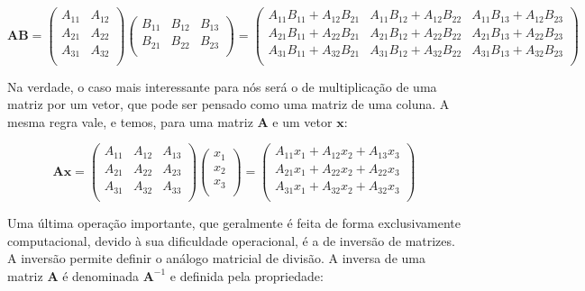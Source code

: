 \documentclass[portuges,]{tufte-handout}
\begin{document}
\[
\mathbf{A}\mathbf{B} =
\left (
\begin{matrix}
A_{11} & A_{12} \\
A_{21} & A_{22}  \\
A_{31} & A_{32} \\
\end{matrix}
\right )
\left (
\begin{matrix}
B_{11} & B_{12} & B_{13} \\
B_{21} & B_{22} & B_{23} \\
\end{matrix}
\right )
=
\left (
\begin{smallmatrix}
A_{11}B_{11} +  A_{12}B_{21} & A_{11}B_{12} +  A_{12}B_{22} & A_{11}B_{13} +  A_{12}B_{23} \\
A_{21}B_{11} +  A_{22}B_{21} & A_{21}B_{12} +  A_{22}B_{22} & A_{21}B_{13} +  A_{22}B_{23} \\
A_{31}B_{11} +  A_{32}B_{21} & A_{31}B_{12} +  A_{32}B_{22} & A_{31}B_{13} +  A_{32}B_{23} \\
\end{smallmatrix}
\right )
\]

Na verdade, o caso mais interessante para nós será o de multiplicação de
uma matriz por um vetor, que pode ser pensado como uma matriz de uma
coluna. A mesma regra vale, e temos, para uma matriz \(\mathbf{A}\) e um
vetor \(\mathbf{x}\):

\[
\mathbf{A}\mathbf{x}  =
\left (
\begin{matrix}
A_{11} & A_{12} & A_{13}\\
A_{21} & A_{22} & A_{23} \\
A_{31} & A_{32} & A_{33}\\
\end{matrix}
\right )
\left (
\begin{matrix}
x_{1}  \\
x_{2}   \\
x_{3}  \\
\end{matrix}
\right )
=
\left (
\begin{matrix}
A_{11}x_{1} +  A_{12}x_{2} +  A_{13}x_{3}\\
A_{21}x_{1} +  A_{22}x_{2} +  A_{22}x_{3}\\
A_{31}x_{1} +  A_{32}x_{2} +  A_{32}x_{3}\\
\end{matrix}
\right )
\]

Uma última operação importante, que geralmente é feita de forma
exclusivamente computacional, devido à sua dificuldade operacional, é a
de inversão de matrizes. A inversão permite definir o análogo matricial
de divisão. A inversa de uma matriz \(\mathbf{A}\) é denominada
\(\mathbf{A}^{-1}\) e definida pela propriedade:
\end{document}
